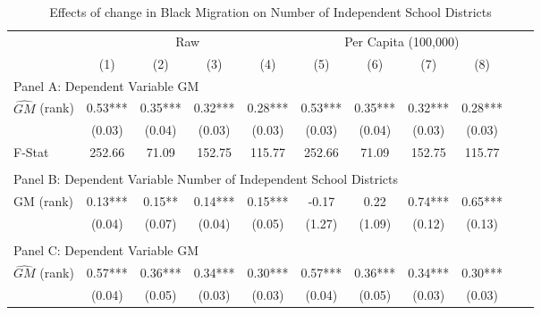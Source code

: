  \begin{table}[htbp]\centering {} \begin{threeparttable} \caption{Effects of change in Black Migration on Number of Independent School Districts} \begin{tabular}{l*{10}{c}} \toprule
                &\multicolumn{4}{c}{Raw}                                    &\multicolumn{4}{c}{Per Capita (100,000)}                   \\\cmidrule(lr){2-5}\cmidrule(lr){6-9}
                &\multicolumn{1}{c}{(1)}   &\multicolumn{1}{c}{(2)}   &\multicolumn{1}{c}{(3)}   &\multicolumn{1}{c}{(4)}   &\multicolumn{1}{c}{(5)}   &\multicolumn{1}{c}{(6)}   &\multicolumn{1}{c}{(7)}   &\multicolumn{1}{c}{(8)}   \\
\cmidrule(lr){1-9}
\multicolumn{8}{l}{Panel A: Dependent Variable GM}\\
\cmidrule(lr){1-9}
$\hat{GM}$ (rank)&       0.53***&       0.35***&       0.32***&       0.28***&       0.53***&       0.35***&       0.32***&       0.28***\\
                &     (0.03)   &     (0.04)   &     (0.03)   &     (0.03)   &     (0.03)   &     (0.04)   &     (0.03)   &     (0.03)   \\
\midrule
F-Stat          &     252.66   &      71.09   &     152.75   &     115.77   &     252.66   &      71.09   &     152.75   &     115.77   \\
\cmidrule[\heavyrulewidth](lr){1-9} \\ \cmidrule[\heavyrulewidth](lr){1-9}
\multicolumn{8}{l}{Panel B: Dependent Variable Number of Independent School Districts}\\
\cmidrule(lr){1-9}
GM  (rank)      &       0.13***&       0.15** &       0.14***&       0.15***&      -0.17   &       0.22   &       0.74***&       0.65***\\
                &     (0.04)   &     (0.07)   &     (0.04)   &     (0.05)   &     (1.27)   &     (1.09)   &     (0.12)   &     (0.13)   \\
\cmidrule[\heavyrulewidth](lr){1-9} \\ \cmidrule[\heavyrulewidth](lr){1-9}
\multicolumn{8}{l}{Panel C: Dependent Variable GM}\\
\cmidrule(lr){1-9}
$\hat{GM}$ (rank)&       0.57***&       0.36***&       0.34***&       0.30***&       0.57***&       0.36***&       0.34***&       0.30***\\
                &     (0.04)   &     (0.05)   &     (0.03)   &     (0.03)   &     (0.04)   &     (0.05)   &     (0.03)   &     (0.03)   \\

\end{tabular}
\end{threeparttable}
\end{table}

